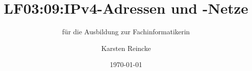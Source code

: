 \documentclass[]{beamer}
\title{LF03:09:IPv4-Adressen und -Netze}
\subtitle{für die Ausbildung zur Fachinformatikerin}
\institute{GS-LDK}
\author{Karsten Reincke}
\date{\today}
\def\cfgGl{../../../cfg.gl/}
\begin{document}

\begin{frame}
  \titlepage
\end{frame}






\logo{}
\newpage



%
\end{document}
